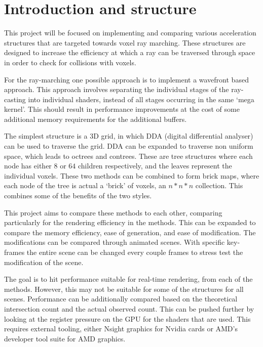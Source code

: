 \section*{Introduction and structure}

This project will be focused on implementing and comparing various
acceleration structures that are targeted towards voxel ray marching.
These structures are designed to increase the efficiency at which a
ray can be traversed through space in order to check for collisions with
voxels.

For the ray-marching one possible approach is to implement a
wavefront\cite{laine2013wavefront} based approach. This approach
involves separating the individual stages of the ray-casting into individual
shaders, instead of all stages occurring in the same `mega kernel'. This should
result in performance improvements at the cost of some additional
memory requirements for the additional buffers.

The simplest structure is a 3D grid, in which DDA (digital
differential analyser)\cite{amanatides1987fast} can be used to
traverse the grid. DDA can be expanded to traverse non uniform space,
which leads to octrees\cite{laine2010svo} and contrees. These are
tree structures where each node has either $8$ or $64$ children
respectively, and the leaves represent the individual voxels. These
two methods can be combined to form brick
maps\cite{van2015brickmap}, where each node of the tree is actual
a `brick' of voxels, an $n*n*n$ collection. This combines some of the
benefits of the two styles.

This project aims to compare these methods to each other, comparing
particularly for the rendering efficiency in the methods. This
can be expanded to compare the memory efficiency, ease of generation,
and ease of modification. The modifications can be compared through
animated scenes. With specific key-frames the entire scene can be changed every
couple frames to stress test the modification of the scene.

The goal is to hit performance suitable for real-time rendering, from each
of the methods. However, this may not be suitable for some of the structures
for all scenes.
Performance can be additionally compared based on the theoretical
intersection count and the actual observed count. This can be
pushed further by looking at the register pressure on the GPU for
the shaders that are used. This requires external tooling, either
Nsight graphics for Nvidia cards or AMD's developer tool suite
for AMD graphics.

